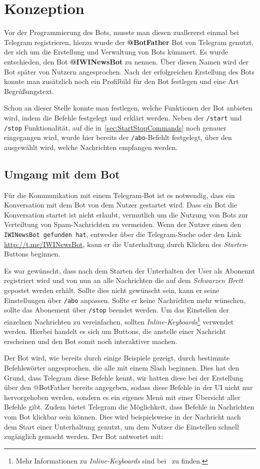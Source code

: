 \chapter{Konzeption}
Vor der Programmierung des Bots, musste man diesen zuallererst einmal bei Telegram registrieren, hierzu wurde der \textbf{@BotFather} Bot von Telegram genutzt, der sich um die Erstellung und Verwaltung von Bots kümmert. Es wurde entschieden, den Bot \textbf{@IWINewsBot} zu nennen. Über diesen Namen wird der Bot später von Nutzern angesprochen. Nach der erfolgreichen Erstellung des Bots konnte man zusätzlich noch ein Profilbild für den Bot festlegen und eine Art Begrüßungstext.

Schon an dieser Stelle konnte man festlegen, welche Funktionen der Bot anbieten wird, indem die Befehle festgelegt und erklärt werden. Neben der \texttt{/start} und \texttt{/stop} Funktionalität, auf die in~\autoref{sec:StartStopCommands} noch genauer eingegangen wird, wurde hier bereits der \texttt{/abo}-Befehlt festgelegt, über den ausgewählt wird, welche Nachrichten empfangen werden.

\section{Umgang mit dem Bot}
Für die Kommunikation mit einem Telegram-Bot ist es notwendig, dass ein Konversation mit dem Bot von dem Nutzer gestartet wird. Dass ein Bot die Konversation startet ist nicht erlaubt, vermutlich um die Nutzung von Bots zur Verteiltung von Spam-Nachrichten zu vermeiden. Wenn der Nutzer einen den \texttt{IWINewsBot gefunden hat}, entweder über die Telegram-Suche oder den Link \url{http://t.me/IWINewsBot}, kann er die Unterhaltung durch Klicken des \textit{Starten}-Buttons beginnen.

Es war gewünscht, dass nach dem Starten der Unterhalten der User als Abonennt registriert wird und von nun an alle Nachrichten die auf dem \emph{Schwarzen Brett} gepostet werden erhält. Sollte dies nicht gewünscht sein, kann er seine Einstellungen über \texttt{/abo} anpassen. Sollte er keine Nachrichten mehr wünschen, sollte das Abonement über \texttt{/stop} beendet werden. Um das Einstellen der einzelnen Nachrichten zu vereinfachen, sollten \emph{Inline-Keyboards}\footnote{Mehr Informationen zu \emph{Inline-Keyboards} sind bei~\cite{InlineKeyboards} zu finden.} verwendet werden. Hierbei handelt es sich um Buttons, die anstelle einer Nachricht erscheinen und den Bot somit noch interaktiver machen.

Der Bot wird, wie bereits durch einige Beispiele gezeigt, durch bestimmte Befehlswörter angesprochen, die alle mit einem Slash beginnen. Dies hat den Grund, dass Telegram diese Befehle kennt, wir hatten diese bei der Erstellung über den @BotFather bereits angegeben, sodass diese Befehle in der UI nicht nur hervorgehoben werden, sondern es ein eigenes Menü mit einer Übersicht aller Befehle gibt. Zudem bietet Telegram die Möglichkeit, dass Befehle in Nachrichten vom Bot klickbar sein können. Dies wird beispielsweise in der Nachricht nach dem Start einer Unterhaltung genutzt, um dem Nutzer die Einstellen schnell zugänglich gemacht werden. Der Bot antwortet mit:

